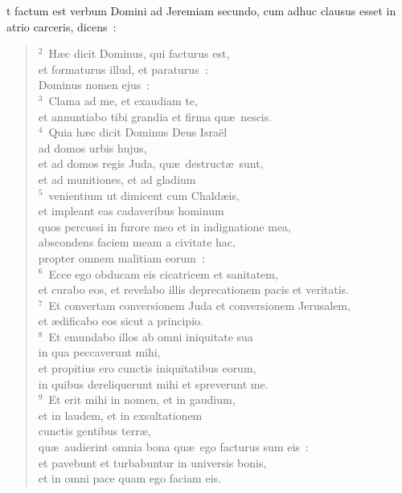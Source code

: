 \bchapter
{}t factum est verbum Domini ad Jeremiam secundo, cum adhuc clausus esset in atrio carceris, dicens~:
\begin{flushleft}\begin{verse}\vspace{6pt}${}^{2}$~H\ae c dicit Dominus, qui facturus est,\\ et formaturus illud, et paraturus~:\\ Dominus nomen ejus~:\\
${}^{3}$~Clama ad me, et exaudiam te,\\ et annuntiabo tibi grandia et firma qu\ae\ nescis.\\
${}^{4}$~Quia h\ae c dicit Dominus Deus Isra\"el\\ ad domos urbis hujus,\\ et ad domos regis Juda, qu\ae\ destruct\ae\ sunt,\\ et ad munitiones, et ad gladium\\
${}^{5}$~venientium ut dimicent cum Chald\ae is,\\ et impleant eas cadaveribus hominum\\ quos percussi in furore meo et in indignatione mea,\\ abscondens faciem meam a civitate hac,\\ propter omnem malitiam eorum~:\\
${}^{6}$~Ecce ego obducam eis cicatricem et sanitatem,\\ et curabo eos, et revelabo illis deprecationem pacis et veritatis.\\
${}^{7}$~Et convertam conversionem Juda et conversionem Jerusalem,\\ et \ae dificabo eos sicut a principio.\\
${}^{8}$~Et emundabo illos ab omni iniquitate sua\\ in qua peccaverunt mihi,\\ et propitius ero cunctis iniquitatibus eorum,\\ in quibus dereliquerunt mihi et spreverunt me.\\
${}^{9}$~Et erit mihi in nomen, et in gaudium,\\ et in laudem, et in exsultationem\\ cunctis gentibus terr\ae ,\\ qu\ae\ audierint omnia bona qu\ae\ ego facturus sum eis~:\\ et pavebunt et turbabuntur in universis bonis,\\ et in omni pace quam ego faciam eis.\\

\end{verse}
\end{flushleft}
